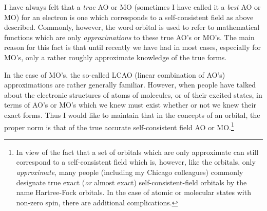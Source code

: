 \documentclass[11pt]{memoir}
\begin{document}
I have always felt that a \emph{true} AO or MO (sometimes I have called it a \emph{best} AO or MO) for an electron is one which corresponds to a self-consistent field as above described.  Commonly, however, the word orbital is used to refer to mathematical functions which are only \emph{approximations} to these true AO's or MO's.  The main reason for this fact is that until recently we have had in most cases, especially for MO's, only a rather roughly approximate knowledge of the true forms.

In the case of MO's, the so-called LCAO (linear combination of AO's) approximations are rather generally familiar.  However, when people have talked about the electronic structures of atoms of molecules, or of their excited states, in terms of AO's or MO's which we knew must exist whether or not we knew their exact forms.  Thus I would like to maintain that in the concepts of an orbital, the proper norm is that of the true accurate self-consistent field AO or MO.\footnote{In view of the fact that a set of orbitals which are only approximate can still correspond to a self-consistent field which is, however, like the orbitals, only \emph{approximate}, many people (including my Chicago colleagues) commonly designate true exact (\emph{or} almost exact) self-consistent-field orbitals by the name Hartree-Fock orbitals.  In the case of atomic or molecular states with non-zero spin, there are additional complications.}

\renewcommand{\thefigure}{\arabic{figure}}
\setcounter{figure}{0}
\end{document}
